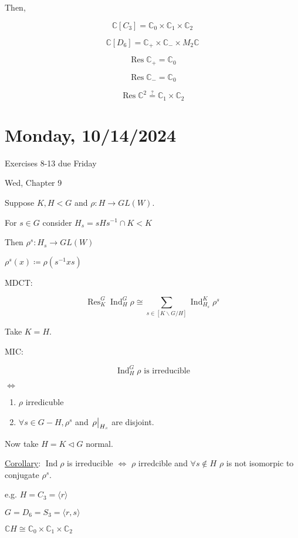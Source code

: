 \documentclass{article}
\theoremstyle{definition}
\begin{document}
Then,

\[
    \mathbb{C} [C_3] = \mathbb{C}_0 \times \mathbb{C}_1 \times \mathbb{C}_2
\]

\[
    \mathbb{C}[D_6] = \mathbb{C}_+ \times \mathbb{C}_- \times M_2 \mathbb{C}
\]

\[
    \operatorname{R es} \mathbb{C}_+ = \mathbb{C}_0 
\]

\[
    \operatorname{R es} \mathbb{C}_- = \mathbb{C}_0 
\]

\[
    \operatorname{R es} \mathbb{C}^2 \overset{?}{=} \mathbb{C}_1 \times \mathbb{C}_2 
\]

\section*{Monday, 10/14/2024}

Exercises 8-13 due Friday

Wed, Chapter 9

Suppose \(K, H < G\) and \(\rho : H \to GL(W)\).

For \(s\in G\) consider \(H_s = s H s ^{-1} \cap K < K\)

Then \(\rho^s : H_s \to GL(W)\) 

\(\rho^s (x) \coloneqq \rho(s ^{-1} x s)\) 

MDCT:

\[
    \operatorname{R es}_K^G \operatorname{Ind}_H^G \rho \cong \sum_{s\in [K \backslash G / H]} \operatorname{Ind}_{H_s}^K \rho^s  
\]

Take \(K = H\).

MIC:

\[
    \operatorname{Ind}_H^G \rho \text{ is irreducible} 
\]

\(\iff\) \begin{enumerate}[label=\alph*)]
    \item \(\rho\) irredicuble
    \item \(\forall s\in G - H, \rho^s\) and \(\eval{\rho}_{H_s} \)  are disjoint.
\end{enumerate} 

Now take \(H = K \triangleleft G\) normal.

\underline{Corollary}: \(\operatorname{Ind} \rho\) is irreducible \(\iff\) \(\rho\) irredcible and \(\forall s\notin H\) \(\rho\) is not isomorpic to conjugate \(\rho^s\).

e.g. \(H = C_3 = \langle r \rangle \) 

\(G = D_6 = S_3 = \langle r, s \rangle \) 

\(\mathbb{C} H \cong \mathbb{C} _0 \times \mathbb{C} _1 \times \mathbb{C}_2\) 
\end{document}
